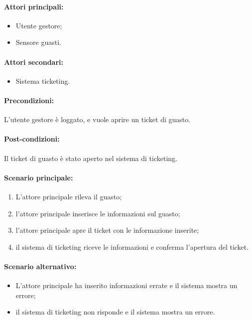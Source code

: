 \paragraph{Attori principali:}
\begin{itemize}
    \item Utente gestore;
    \item Sensore guasti.
\end{itemize}

\paragraph{Attori secondari:}
\begin{itemize}
    \item Sistema ticketing.
\end{itemize}

\paragraph{Precondizioni:}
L'utente gestore è loggato, e vuole aprire un ticket di guasto.

\paragraph{Post-condizioni:}
Il ticket di guasto è stato aperto nel sistema di ticketing.

\paragraph{Scenario principale:}
\begin{enumerate}
    \item L'attore principale rileva il guasto;
    \item l'attore principale inserisce le informazioni sul guasto;
    \item l'attore principale apre il ticket con le informazione inserite;
    \item il sistema di ticketing riceve le informazioni e conferma l'apertura del ticket.
\end{enumerate}

\paragraph{Scenario alternativo:}
\begin{itemize}
    \item L'attore principale ha inserito informazioni errate e il sistema mostra un errore;
    \item il sistema di ticketing non risponde e il sistema mostra un errore.
\end{itemize}
